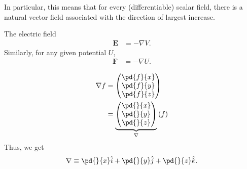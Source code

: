 \documentclass[10pt]{mypackage}
\begin{document}
In particular, this means that for every (differentiable) scalar field, there is a natural vector field associated with the direction of largest increase.
\begin{example}
  The electric field
  \begin{align*}
    \mathbf{E} &= -\nabla V.
  \end{align*}
  Similarly, for any given potential $U$, 
  \begin{align*}
    \mathbf{F} &= -\nabla U.
  \end{align*}
\end{example}
\begin{definition}
  \begin{align*}
    \nabla f &= \begin{pmatrix}\pd{f}{x}\\\pd{f}{y}\\\pd{f}{z}\end{pmatrix}\\
             &= \underbrace{\begin{pmatrix}\pd{}{x}\\\pd{}{y}\\\pd{}{z}\end{pmatrix}}_{\nabla} \left(f\right)
  \end{align*}
  Thus, we get
  \begin{align*}
    \nabla \equiv \pd{}{x}\hat{i} + \pd{}{y}\hat{j} + \pd{}{z}\hat{k}.
  \end{align*}
\end{definition}
\end{document}
